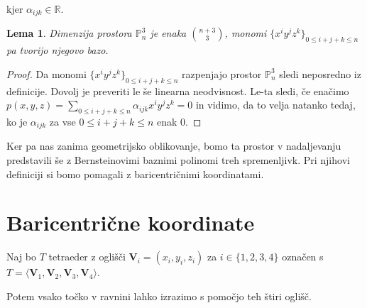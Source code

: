 \documentclass[a4paper, 12pt]{article}
\theoremstyle{definition} %
\theoremstyle{plain} %
\newtheorem{lemma}[theorem]{Lema}
\begin{document}
kjer $\alpha_{ijk}\in\mathbb{R}$.

\begin{lemma}
    Dimenzija prostora $\mathbb{P}_n^3$ je enaka $\binom{n+3}{3}$,
    monomi $\{x^iy^jz^k\}_{0\leq i+j+k\leq n}$ pa tvorijo njegovo bazo. 
\end{lemma}

\begin{proof}
    Da monomi $\{x^iy^jz^k\}_{0\leq i+j+k\leq n}$ razpenjajo
    prostor $\mathbb{P}_n^3$ sledi neposredno iz definicije.
    Dovolj je preveriti le še linearna neodvisnost. Le-ta sledi, če enačimo
    $p(x,y,z)=\sum_{0\leq i+j+k\leq n}\alpha_{ijk}x^iy^jz^k=0$
    in vidimo, da to velja natanko tedaj, ko je $\alpha_{ijk}$ 
    za vse $0\leq i+j+k\leq n$ enak 0.
\end{proof}

Ker pa nas zanima geometrijsko oblikovanje, bomo ta prostor v nadaljevanju 
predstavili še z Bernsteinovimi baznimi polinomi treh spremenljivk. Pri
njihovi definiciji si bomo pomagali z baricentričnimi koordinatami.
	
\section{Baricentrične koordinate}
Naj bo $T$ tetraeder z oglišči $\textbf{V}_{i} = (x_{i}, y_{i}, z_{i})$ za $i \in \{1, 2, 3, 4\}$ označen s
$T = \langle\textbf{V}_{1}, \textbf{V}_{2}, \textbf{V}_{3}, \textbf{V}_{4}\rangle.$

Potem vsako točko v ravnini lahko izrazimo s pomočjo teh štiri oglišč.
\end{document}
